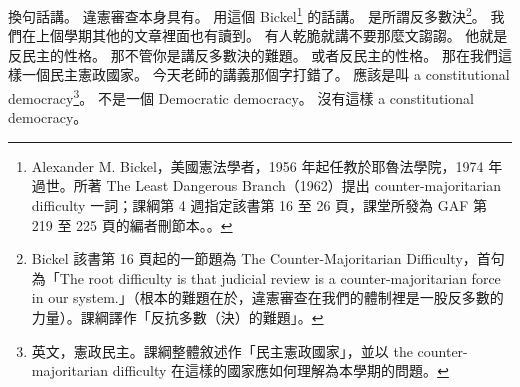 \hypertarget{w01:cue:326}{}換句話講。
\hypertarget{w01:cue:327}{}違憲審查本身具有。
\hypertarget{w01:cue:328}{}用這個 Bickel\footnote{Alexander M. Bickel，美國憲法學者，1956 年起任教於耶魯法學院，1974 年過世。所著 The Least Dangerous Branch（1962）提出 counter-majoritarian difficulty 一詞；課綱第 4 週指定該書第 16 至 26 頁，課堂所發為 GAF 第 219 至 225 頁的編者刪節本。\cite{bickel2004}。} 的話講。
\hypertarget{w01:cue:329}{}是所謂反多數決\footnote{Bickel 該書第 16 頁起的一節題為 The Counter-Majoritarian Difficulty，首句為「The root difficulty is that judicial review is a counter-majoritarian force in our system.」（根本的難題在於，違憲審查在我們的體制裡是一股反多數的力量）。課綱譯作「反抗多數（決）的難題」。}。
\hypertarget{w01:cue:330}{}我們在上個學期其他的文章裡面也有讀到。
\hypertarget{w01:cue:331}{}有人乾脆就講不要那麼文謅謅。
\hypertarget{w01:cue:332}{}他就是反民主的性格。
\hypertarget{w01:cue:333}{}那不管你是講反多數決的難題。
\hypertarget{w01:cue:334}{}或者反民主的性格。
\hypertarget{w01:cue:335}{}那在我們這樣一個民主憲政國家。
\hypertarget{w01:cue:336}{}今天老師的講義那個字打錯了。
\hypertarget{w01:cue:337}{}應該是叫 a constitutional democracy\footnote{英文，憲政民主。課綱整體敘述作「民主憲政國家」，並以 the counter-majoritarian difficulty 在這樣的國家應如何理解為本學期的問題。}。
\hypertarget{w01:cue:338}{}不是一個 Democratic democracy。
\hypertarget{w01:cue:339}{}沒有這樣 a constitutional democracy。


